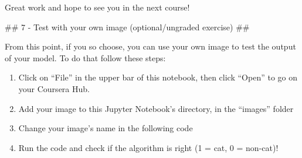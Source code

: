 \documentclass[11pt]{article}
\providecommand{\tightlist}{%
      \setlength{\itemsep}{0pt}\setlength{\parskip}{0pt}}
\begin{document}
Great work and hope to see you in the next course!

    \#\# 7 - Test with your own image (optional/ungraded exercise) \#\#

From this point, if you so choose, you can use your own image to test
the output of your model. To do that follow these steps:

\begin{enumerate}
\def\labelenumi{\arabic{enumi}.}
\tightlist
\item
  Click on ``File'' in the upper bar of this notebook, then click
  ``Open'' to go on your Coursera Hub.
\item
  Add your image to this Jupyter Notebook's directory, in the ``images''
  folder
\item
  Change your image's name in the following code
\item
  Run the code and check if the algorithm is right (1 = cat, 0 =
  non-cat)!
\end{enumerate}
\end{document}
